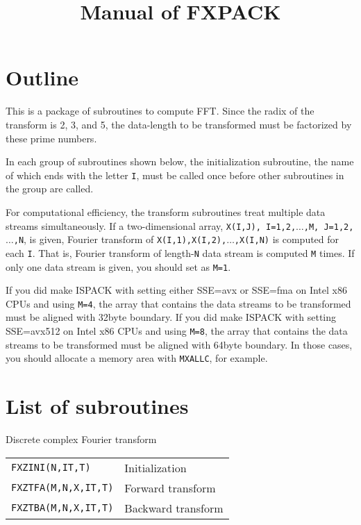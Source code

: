 \documentclass[a4paper]{scrartcl}
\title{Manual of FXPACK}
\author{}
\date{}
\begin{document}
\maketitle

\section{Outline}

This is a package of subroutines to compute FFT.
Since the radix of the transform is 2, 3, and 5,  
the data-length to be transformed must be factorized by
these prime numbers.

In each group of subroutines shown below, the initialization
subroutine, the name of which ends with the letter \texttt{I},
must be called once before other subroutines in the group are
called. 

For computational efficiency, the transform subroutines treat
multiple data streams simultaneously. If a two-dimensional
array, \texttt{X(I,J), I=1,2,$\ldots$,M, J=1,2,$\ldots$,N}, is
given, Fourier transform of \texttt{X(I,1),X(I,2),$\ldots$,X(I,N)}
is computed for each \texttt{I}. That is, Fourier transform
of length-\texttt{N} data stream is computed \texttt{M} times.
If only one data stream is given, you should set as \texttt{M=1}.

If you did make ISPACK with setting either SSE=avx or SSE=fma
on Intel x86 CPUs and using \texttt{M=4}, the array that contains
the data streams to be transformed must be aligned with 32byte
boundary.
If you did make ISPACK with setting SSE=avx512
on Intel x86 CPUs and using \texttt{M=8}, the array that contains
the data streams to be transformed must be aligned with 64byte
boundary.
In those cases, you should allocate a memory area with
\texttt{MXALLC}, for example.

\section{List of subroutines}

Discrete complex Fourier transform

\vspace{1ex}

  \begin{tabular}{ll}
    \texttt{FXZINI(N,IT,T)} & Initialization\\
    \texttt{FXZTFA(M,N,X,IT,T)} & Forward transform\\
    \texttt{FXZTBA(M,N,X,IT,T)} & Backward transform
  \end{tabular}
\end{document}
